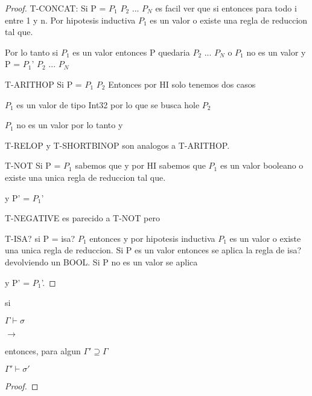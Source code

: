 \begin{proof}
T-CONCAT: Si P = $P_{1}$ $P_{2}$ ... $P_{N}$ es facil ver que si
entonces  para todo i entre 1 y n.
 Por hipotesis inductiva $P_{1}$ es un valor o existe
una regla de reduccion tal que.

 \fullarrow {}

Por lo tanto si $P_{1}$ es un valor entonces P quedaria $P_{2}$ ... $P_{N}$
o $P_{1}$ no es un valor y P = $P_{1}$' $P_{2}$ ... $P_{N}$

T-ARITHOP Si P = $P_{1}$  $P_{2}$ Entonces por HI solo tenemos dos casos
 
$P_{1}$ es un valor de tipo Int32 por lo que se busca hole $P_{2}$

$P_{1}$ no es un valor por lo tanto  \fullarrow {}
y  \fullarrow {}

T-RELOP y T-SHORTBINOP son analogos a T-ARITHOP.

T-NOT Si P =  $P_{1}$ sabemos que  y por HI
sabemos que $P_{1}$ es un valor booleano o existe una unica regla de reduccion tal que.

 \fullarrow {}

y P' =  $P_{1}$'

T-NEGATIVE es parecido a T-NOT pero 

T-ISA? si P = isa?  $P_{1}$ entonces 
y por hipotesis inductiva $P_{1}$ es un valor o existe una unica regla de reduccion.
Si P es un valor entonces se aplica la regla de isa? devolviendo un BOOL.
Si P no es un valor se aplica 

 \fullarrow {}

y P' =   $P_{1}$'.

\end{proof}

\begin{theorem}[Preservacion]
    si


    $\Gamma \vdash \sigma$

      $\rightarrow$ 

    entonces, para algun $\Gamma' \supseteq  \Gamma$


    $\Gamma' \vdash \sigma'$

\end{theorem}

\begin{proof}

\end{proof}

